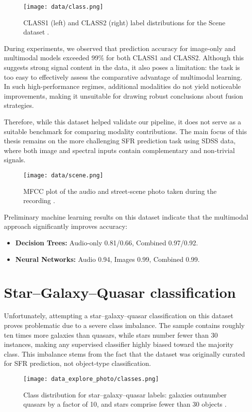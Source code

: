 \documentclass[english,bachelor,oneside]{ctufit-thesis}
\begin{document}
\begin{figure}[H]
    \centering
    \texttt{[image: data/class.png]}
    \caption{CLASS1 (left) and CLASS2 (right) label distributions for the Scene dataset \cite{scene}.}
    \label{fig:scene_pie}
\end{figure}

During experiments, we observed that prediction accuracy for image-only and multimodal models exceeded 99\% for both CLASS1 and CLASS2. Although this suggests strong signal content in the data, it also poses a limitation: the task is too easy to effectively assess the comparative advantage of multimodal learning. In such high-performance regimes, additional modalities do not yield noticeable improvements, making it unsuitable for drawing robust conclusions about fusion strategies.

Therefore, while this dataset helped validate our pipeline, it does not serve as a suitable benchmark for comparing modality contributions. The main focus of this thesis remains on the more challenging SFR prediction task using SDSS data, where both image and spectral inputs contain complementary and non-trivial signals.

\begin{figure}[h]
    \centering
    \texttt{[image: data/scene.png]}
    \caption{MFCC plot of the audio and street‐scene photo taken during the recording \cite{scene}.}
    \label{fig:prism}
\end{figure}

Preliminary machine learning results on this dataset indicate that the multimodal approach significantly improves accuracy:
\begin{itemize}
    \item \textbf{Decision Trees:} Audio-only 0.81/0.66, Combined 0.97/0.92.
    \item \textbf{Neural Networks:} Audio 0.94, Images 0.99, Combined 0.99.
\end{itemize}

\section{Star–Galaxy–Quasar classification}

Unfortunately, attempting a star–galaxy–quasar classification on this dataset proves problematic due to a severe class imbalance. The sample contains roughly ten times more galaxies than quasars, while stars number fewer than 30 instances, making any supervised classifier highly biased toward the majority class. This imbalance stems from the fact that the dataset was originally curated for SFR prediction, not object‐type classification.
\begin{figure}[H]
  \centering
  \texttt{[image: data\_explore\_photo/classes.png]}
  \caption{Class distribution for star–galaxy–quasar labels: galaxies outnumber quasars by a factor of 10, and stars comprise fewer than 30 objects \cite{data_exploring}.}
  \label{fig:class_distribution}
\end{figure}
\end{document}
